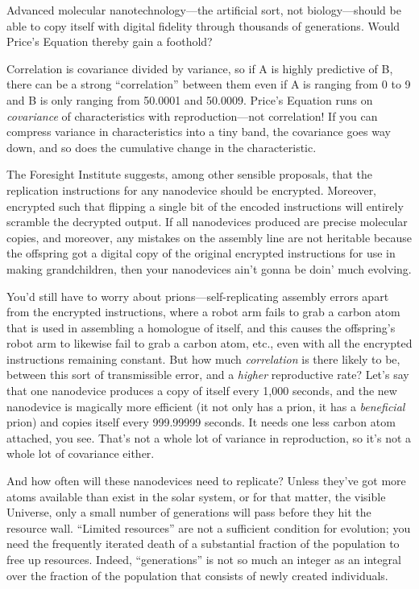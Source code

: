 {
 Advanced molecular nanotechnology---the artificial sort, not
biology---should be able to copy itself with digital fidelity through
thousands of generations. Would Price's Equation
thereby gain a foothold?}

{
 Correlation is covariance divided by variance, so if A is highly
predictive of B, there can be a strong
``correlation'' between them even if
A is ranging from 0 to 9 and B is only ranging from 50.0001 and
50.0009. Price's Equation runs on \textit{covariance}
of characteristics with reproduction---not correlation! If you can
compress variance in characteristics into a tiny band, the covariance
goes way down, and so does the cumulative change in the
characteristic.}

{
 The Foresight Institute suggests, among other sensible proposals,
that the replication instructions for any nanodevice should be
encrypted. Moreover, encrypted such that flipping a single bit of the
encoded instructions will entirely scramble the decrypted output. If
all nanodevices produced are precise molecular copies, and moreover,
any mistakes on the assembly line are not heritable because the
offspring got a digital copy of the original encrypted instructions for
use in making grandchildren, then your nanodevices
ain't gonna be doin' much evolving.}

{
 You'd still have to worry about
prions---self-replicating assembly errors apart from the encrypted
instructions, where a robot arm fails to grab a carbon atom that is
used in assembling a homologue of itself, and this causes the
offspring's robot arm to likewise fail to grab a carbon
atom, etc., even with all the encrypted instructions remaining
constant. But how much \textit{correlation} is there likely to be,
between this sort of transmissible error, and a \textit{higher}
reproductive rate? Let's say that one nanodevice
produces a copy of itself every 1,000 seconds, and the new nanodevice
is magically more efficient (it not only has a prion, it has a
\textit{beneficial} prion) and copies itself every 999.99999 seconds.
It needs one less carbon atom attached, you see. That's
not a whole lot of variance in reproduction, so it's
not a whole lot of covariance either.}

{
 And how often will these nanodevices need to replicate? Unless
they've got more atoms available than exist in the
solar system, or for that matter, the visible Universe, only a small
number of generations will pass before they hit the resource wall.
``Limited resources'' are not a
sufficient condition for evolution; you need the frequently iterated
death of a substantial fraction of the population to free up resources.
Indeed, ``generations'' is not so
much an integer as an integral over the fraction of the population that
consists of newly created individuals.}

